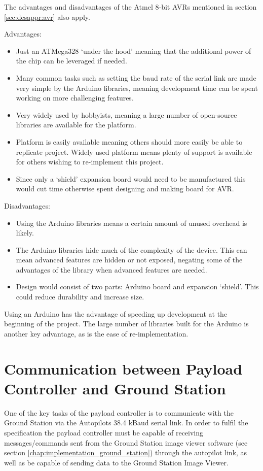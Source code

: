 The advantages and disadvantages of the Atmel 8-bit AVRs mentioned in section \ref{sec:desappr:avr} also apply.

Advantages:
\begin{itemize}
\item Just an ATMega328 `under the hood' meaning that the additional power of the chip can be leveraged if needed.

\item Many common tasks such as setting the baud rate of the serial link are made very simple by the Arduino libraries, meaning development time can be spent working on more challenging features.

\item Very widely used by hobbyists, meaning a large number of open-source libraries are available for the platform.

\item Platform is easily available meaning others should more easily be able to replicate project. Widely used platform means plenty of support is available for others wishing to re-implement this project.

\item Since only a `shield' expansion board would need to be manufactured this would cut time otherwise spent designing and making board for AVR.
\end{itemize}

Disadvantages:
\begin{itemize}
\item Using the Arduino libraries means a certain amount of unused overhead is likely.

\item The Arduino libraries hide much of the complexity of the device. This can mean advanced features are hidden or not exposed, negating some of the advantages of the library when advanced features are needed.

\item Design would consist of two parts: Arduino board and expansion `shield'. This could reduce durability and increase size.
\end{itemize}

Using an Arduino has the advantage of speeding up development at the beginning of the project. The large number of libraries built for the Arduino is another key advantage, as is the ease of re-implementation.

\section{Communication between Payload Controller and Ground Station}
One of the key tasks of the payload controller is to communicate with the Ground Station via the Autopilots 38.4 kBaud serial link. In order to fulfil the specification the payload controller must be capable of receiving messages/commands sent from the Ground Station image viewer software (see section \ref{chap:implementation_ground_station}) through the autopilot link, as well as be capable of sending data to the Ground Station Image Viewer.

